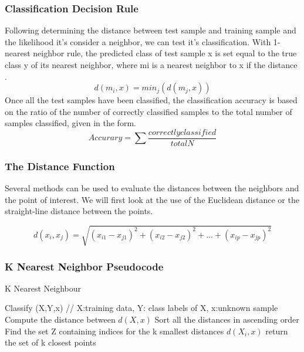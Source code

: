 \documentclass{report}
\begin{document}
\subsubsection*{Classification Decision Rule}
Following determining the distance between test sample and training sample and the likelihood it's consider a neighbor, we can test it's classification.
With 1-nearest neighbor rule, the predicted class of test sample x is set equal to the true class y of its nearest neighbor, where mi is a nearest neighbor to x if the distance \cite{7}.
\begin{equation}
d(m_{i},x) = min_{j}(d(m_{j},x))
\end{equation} 
Once all the test samples have been classified, the classification accuracy is based on the ratio of the number of correctly classified samples to the total number of samples classified, given in the form.
\begin{equation}
Accurary = \sum \frac{correctly classified}{total N}
\end{equation}
		


\subsubsection*{The Distance Function}

Several methods can be used to evaluate the distances between the neighbors and the point of interest.
We will first look at the use of the Euclidean distance or the straight-line distance between the points.

\begin{equation}
d(x_{i},x_{j}) = \sqrt{(x_{i1} - x_{j1})^2 + (x_{i2} - x_{j2})^2 + ... + (x_{ip} - x_{jp})^2}
\end{equation}

\subsubsection{K Nearest Neighbor Pseudocode }
\begin{algorithm}
  \caption{K Nearest Neighbour}
  \begin{algorithmic}
  	\State Classify (X,Y,x) // X:training data, Y: class labels of X, x:unknown sample
	\State Compute the distance between $d(X, x)$
	\State Sort all the distances in ascending order
	\EndFor
	\State Find the set Z containing indices for the k smallest distances $d(X_{i},x)$
	\State return the set of k closest points 
  \end{algorithmic}
\end{algorithm}
\end{document}
